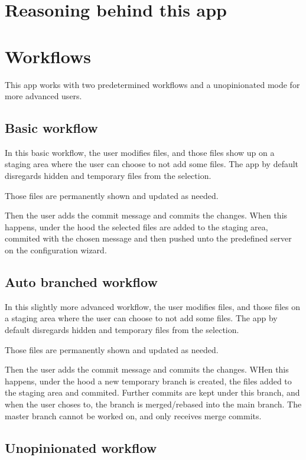 \documentclass[GitEase.tex]{subfiles}
\begin{document}
\chapter{Reasoning behind this app}

\chapter{Workflows}

This app works with two predetermined workflows and a unopinionated mode for more advanced users.

\section{Basic workflow}

In this basic workflow, the user modifies files, and those files show up on a staging area where the user can choose to not add some files.
The app by default disregards hidden and temporary files from the selection.

Those files are permanently shown and updated as needed.

Then the user adds the commit message and commits the changes. When this happens, under the hood the selected files are added to the staging area, commited with the chosen message and then pushed unto the predefined server on the configuration wizard.

\section{Auto branched workflow}

In this slightly more advanced workflow, the user modifies files, and those files on a staging area where the user can choose to not add some files.
The app by default disregards hidden and temporary files from the selection.

Those files are permanently shown and updated as needed.

Then the user adds the commit message and commits the changes. WHen this happens, under the hood a new temporary branch is created, the files added to the staging area and commited.
Further commits are kept under this branch, and when the user choses to, the branch is merged/rebased into the main branch. The master branch cannot be worked on, and only receives merge commits.

\section{Unopinionated workflow}
\end{document}
